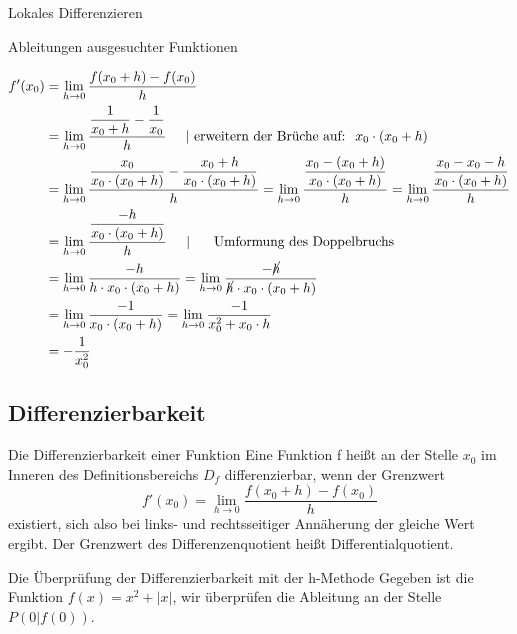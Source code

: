 \begin{section}{Lokales Differenzieren}
\begin{bsp*}{Ableitungen ausgesuchter Funktionen}{}
\begin{itemize}
\begin{equation*}
\begin{split}
f'(x_0)&= \lim_{h\rightarrow 0} \dfrac{f(x_0 +h) - f(x_0)}{h}\\
&= \lim_{h\rightarrow 0} \dfrac{\dfrac{1}{x_0 + h} -\dfrac{1}{x_0}}{h} \hspace{0.5cm} | \text{ erweitern der Brüche auf: }\hspace{0.1cm} x_0 \cdot (x_0 + h) \\
&= \lim_{h\rightarrow 0} \dfrac{\dfrac{x_0}{x_0\cdot (x_0 + h)} -\dfrac{x_0 + h}{x_0\cdot (x_0 + h)}}{h} 
= \lim_{h\rightarrow 0} \dfrac{\dfrac{x_0 - (x_0 +h)}{x_0\cdot (x_0 + h)}}{h}
= \lim_{h\rightarrow 0} \dfrac{\dfrac{x_0 - x_0 -h}{x_0\cdot (x_0 + h)}}{h}\\
&= \lim_{h\rightarrow 0} \dfrac{\dfrac{-h}{x_0\cdot (x_0 + h)}}{h} \hspace{0.5cm} | \hspace{0.5cm}\text{ Umformung des Doppelbruchs } \\
&= \lim_{h\rightarrow 0} \dfrac{-h}{h\cdot x_0\cdot (x_0 + h)}
= \lim_{h\rightarrow 0} \dfrac{-\cancel{h}}{\cancel{h}\cdot x_0\cdot (x_0 + h)}\\
&=\lim_{h\rightarrow 0} \dfrac{-1}{x_0\cdot (x_0 + h)} = \lim_{h\rightarrow 0} \dfrac{-1}{x^2_0 + x_0\cdot h}\\
&= -\dfrac{1}{x^2_0}
\end{split}
\end{equation*}
\end{itemize}
\end{bsp*}
\subsection{Differenzierbarkeit} 
\begin{defi}{Die Differenzierbarkeit einer Funktion}{}
 Eine Funktion f heißt an der Stelle $x_0$ im Inneren des Definitionsbereichs $D_f$ differenzierbar, wenn der Grenzwert \begin{equation*}
     f'(x_0) =\lim_{h\rightarrow 0}\dfrac{f(x_0 +h) -f(x_0)}{h}
 \end{equation*} existiert, sich also bei links- und rechtsseitiger Annäherung der gleiche Wert ergibt. Der Grenzwert des Differenzenquotient heißt Differentialquotient.
\end{defi}
\begin{bsp*}{Die Überprüfung der Differenzierbarkeit mit der h-Methode}
    Gegeben ist die Funktion $f(x)= x^2 + |x|$, wir überprüfen die Ableitung an der Stelle $P(0|f(0))$.


\end{bsp*}
\end{section}
